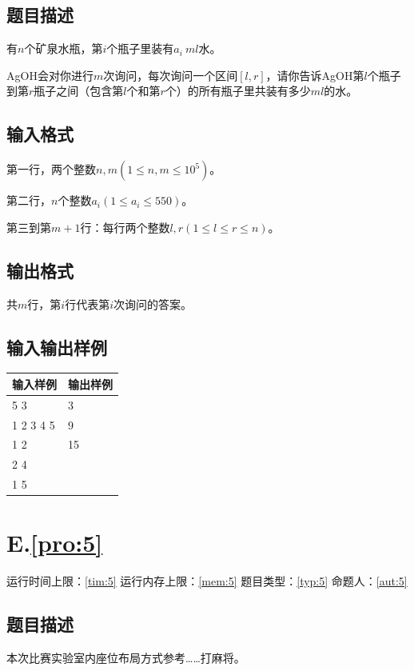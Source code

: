 \documentclass[
	lang=cn,
	color=green
]{elegantbook}
\begin{document}
\section*{题目描述}
有$n$个矿泉水瓶，第$i$个瓶子里装有$a_i\ ml$水。

AgOH会对你进行$m$次询问，每次询问一个区间$[l,r]$，请你告诉AgOH第$l$个瓶子到第$r$瓶子之间（包含第$l$个和第$r$个）的所有瓶子里共装有多少$ml$的水。

\section*{输入格式}
第一行，两个整数$n,m(1 \leq n,m \leq 10^5)$。

第二行，$n$个整数$a_i(1 \leq a_i \leq 550)$。

第三到第$m+1$行：每行两个整数$l,r(1 \leq l \leq r \leq n)$。

\section*{输出格式}
共$m$行，第$i$行代表第$i$次询问的答案。

\section*{输入输出样例}
\begin{tabularx}{450pt}{X|X}
	\toprule
	输入样例  & 输出样例 \\
	\midrule
	5 3       & 3        \\
	1 2 3 4 5 & 9        \\
	1 2       & 15       \\
	2 4       &          \\
	1 5       &          \\
	\bottomrule
\end{tabularx}

\newpage
\chapter*{E.\quad \ref*{pro:5}}
\begin{center}
	运行时间上限：\ref*{tim:5} \quad 运行内存上限：\ref*{mem:5} \quad 题目类型：\ref*{typ:5} \quad 命题人：\ref*{aut:5}
\end{center}

\section*{题目描述}
本次比赛实验室内座位布局方式参考……打麻将。
\end{document}
